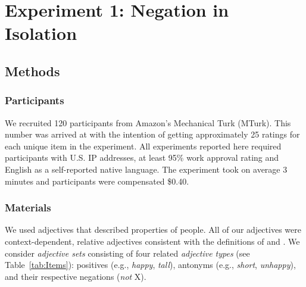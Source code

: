 \documentclass[floatsintext,doc]{apa6}
\newcommand{\datafoldername}{csv_data_4_tex}
\newcommand{\rlnum}[2]{\num[output-decimal-marker={.},
                             exponent-product = \cdot,
                             round-mode=places,
                             round-precision=#2,
                             group-digits=false]{#1}}
\newcommand{\rlgetnum}[5]{\csvreader[filter strcmp={\mykey}{#3},
             late after line = {{,}\ }, late after last line = {{}}]
            {\datafoldername/#1}{#2=\mykey,#4=\myvalue}{\rlnum{\myvalue}{#5}}}
\begin{document}
\section{Experiment 1: Negation in Isolation}





\subsection{Methods}
\subsubsection{Participants}\label{participants}%

We recruited 120 participants from Amazon's Mechanical Turk (MTurk).
This number was arrived at with the intention of getting approximately 25 ratings for each unique item in the experiment.
All experiments reported here required participants with U.S. IP addresses, at least 95\% work approval rating and English as a self-reported native language.
The experiment took on average 3 minutes and participants were compensated \$0.40.

\subsubsection{Materials}\label{materials}%

We used adjectives that described properties of people.
All of our adjectives were context-dependent, relative adjectives consistent with the definitions of  and .
We consider \emph{adjective sets} consisting of four related \emph{adjective types} (see Table~\ref{tab:Items}): positives (e.g., \emph{happy}, \emph{tall}), antonyms (e.g., \emph{short}, \emph{unhappy}), and their respective negations (\emph{not} X).
\end{document}
